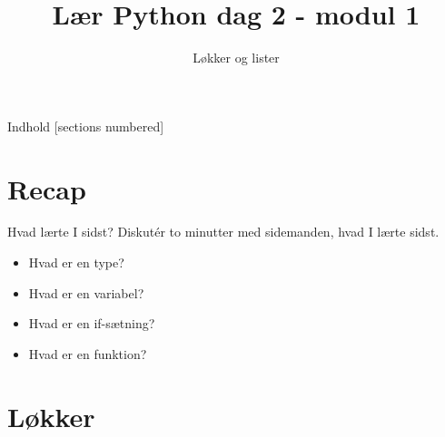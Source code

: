 

\title{Lær Python dag 2 - modul 1}
\subtitle{Løkker og lister}



\maketitle

\begin{frame}{Indhold}
  [sections numbered]
  \tableofcontents[hideallsubsections]
\end{frame}

\section{Recap}



\begin{frame}[fragile]{Hvad lærte I sidst?}
Diskutér to minutter med sidemanden, hvad I lærte sidst.

	\begin{itemize}
		\item Hvad er en type?
		\item Hvad er en variabel?
		\item Hvad er en if-sætning?
		\item Hvad er en funktion?
	\end{itemize}
\end{frame}

%

\section{Løkker}

